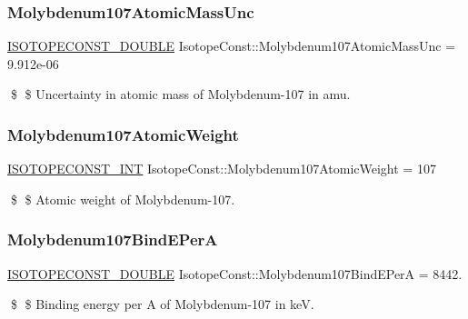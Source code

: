 \subsubsection{\texorpdfstring{Molybdenum107\+Atomic\+Mass\+Unc}{Molybdenum107AtomicMassUnc}}
{\footnotesize\ttfamily \mbox{\hyperlink{group___isotope_const-_macros_ga8f45a7272ce02c0b4c65c44636ed719a}{I\+S\+O\+T\+O\+P\+E\+C\+O\+N\+S\+T\+\_\+\+D\+O\+U\+B\+LE}} Isotope\+Const\+::\+Molybdenum107\+Atomic\+Mass\+Unc = 9.\+912e-\/06}

\$ \$ Uncertainty in atomic mass of Molybdenum-\/107 in amu. \mbox{\label{group___isotope_const-_molybdenum-_mo107_ga393f2b1ff57a905c9c99e8d5ec7e588d}} 
\subsubsection{\texorpdfstring{Molybdenum107\+Atomic\+Weight}{Molybdenum107AtomicWeight}}
{\footnotesize\ttfamily \mbox{\hyperlink{group___isotope_const-_macros_ga5f18360b3e99483a35c32d789e62621c}{I\+S\+O\+T\+O\+P\+E\+C\+O\+N\+S\+T\+\_\+\+I\+NT}} Isotope\+Const\+::\+Molybdenum107\+Atomic\+Weight = 107}

\$ \$ Atomic weight of Molybdenum-\/107. \mbox{\label{group___isotope_const-_molybdenum-_mo107_ga7ba781d1c69fd5d39a83ab7e49e68bdd}} 
\subsubsection{\texorpdfstring{Molybdenum107\+Bind\+E\+PerA}{Molybdenum107BindEPerA}}
{\footnotesize\ttfamily \mbox{\hyperlink{group___isotope_const-_macros_ga8f45a7272ce02c0b4c65c44636ed719a}{I\+S\+O\+T\+O\+P\+E\+C\+O\+N\+S\+T\+\_\+\+D\+O\+U\+B\+LE}} Isotope\+Const\+::\+Molybdenum107\+Bind\+E\+PerA = 8442.}

\$ \$ Binding energy per A of Molybdenum-\/107 in keV. \mbox{\label{group___isotope_const-_molybdenum-_mo107_gaf11a64239c2cab4e0e274eca1c20a8fe}} 
